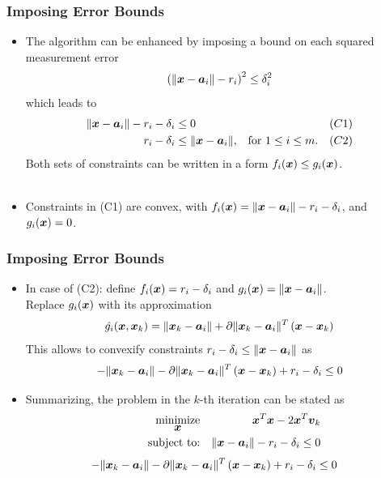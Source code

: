 \documentclass [t] {beamer} %
\begin{document}
\begin{frame} %
\frametitle{Imposing Error Bounds} 
\phantom{m}
\begin{itemize}
\item
The algorithm can be enhanced by imposing a bound on each squared measurement error
\begin{equation} 
\nonumber
\left(\|\mbox{\boldmath$x$} - \mbox{\boldmath$a$}_i\| - r_i \right)^2 \leq \delta_i^2
\end{equation}
which leads to
\begin{eqnarray} 
\nonumber
\begin{aligned}
\|\mbox{\boldmath$x$} - \mbox{\boldmath$a$}_i\| - r_i -  \delta_i  & \leq  0 &{} & (C1) \\ 
r_i - \delta_i & \leq  \|\mbox{\boldmath$x$} - \mbox{\boldmath$a$}_i\|,   & \mbox{for } 1 \leq i \leq m. \quad & (C2)
\end{aligned}
\end{eqnarray} 
 Both sets of constraints can be written in a form $f_i(\mbox{\boldmath$x$}) \leq g_i(\mbox{\boldmath$x$}) $.   \\~\\

\item
Constraints in  (C1) are convex, with $f_i(\mbox{\boldmath$x$})  = \|\mbox{\boldmath$x$} - \mbox{\boldmath$a$}_i\|  -  r_i  -  \delta_i$, and $g_i(\mbox{\boldmath$x$})  =  0$. \end{itemize}
\end{frame}

\begin{frame} %
\frametitle{Imposing Error Bounds} 
\begin{itemize}
\item
In case of (C2): define $f_i(\mbox{\boldmath$x$}) =r_i - \delta_i  $ and $g_i(\mbox{\boldmath$x$}) =  \|\mbox{\boldmath$x$} - \mbox{\boldmath$a$}_i\|$.  \\
Replace $g_i(\mbox{\boldmath$x$})$ with its approximation
\begin{equation}
\nonumber
\hat{g_i}(\mbox{\boldmath$x$},\mbox{\boldmath$x$}_k) = \| \mbox{\boldmath$x$}_k - \mbox{\boldmath$a$}_i\| + \partial \|\mbox{\boldmath$x$}_k - \mbox{\boldmath$a$}_i \| ^T \left( \mbox{\boldmath$x$} - \mbox{\boldmath$x$}_k \right)
\end{equation}
This allows to convexify constraints $r_i - \delta_i  \leq  \|\mbox{\boldmath$x$} - \mbox{\boldmath$a$}_i\|$ as
\begin{equation}
\nonumber
- \|\mbox{\boldmath$x$}_k - \mbox{\boldmath$a$}_i \| - \partial \|\mbox{\boldmath$x$}_k - \mbox{\boldmath$a$}_i \| ^T \left( \mbox{\boldmath$x$} - \mbox{\boldmath$x$}_k\right) + r_i - \delta_i \leq 0 
\end{equation}

\item
Summarizing, the problem in the $k$-th iteration can be stated as
\setlength{\belowdisplayskip}{0pt} \setlength{\belowdisplayshortskip}{0pt}
\begin{eqnarray}
\nonumber
  \mathop{\mbox{minimize}}_{\mbox{\boldmath$x$}}&&\mbox{\boldmath$x$}^T\mbox{\boldmath$x$} - 2\mbox{\boldmath$x$}^T \mbox{\boldmath$v$}_k \\
\nonumber
\ \ \qquad \mbox{subject to:}&&\| \mbox{\boldmath$x$} - \mbox{\boldmath$a$}_i\| - r_i - \delta_i \leq 0 
\end{eqnarray}
\begin{eqnarray}
\nonumber
  -\|\mbox{\boldmath$x$}_k-\mbox{\boldmath$a$}_i\|-\partial\|\mbox{\boldmath$x$}_k-\mbox{\boldmath$a$}_i\|^T\left(\mbox{\boldmath$x$}-\mbox{\boldmath$x$}_k\right) +r_i-\delta_i\leq 0 \quad
\end{eqnarray}
\end{itemize}
\end{frame}
\end{document}
